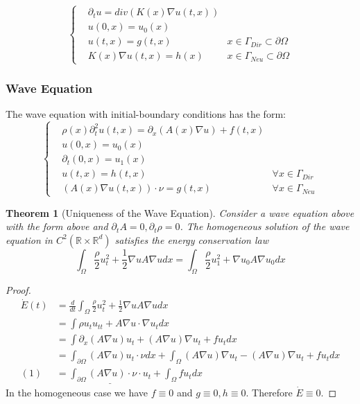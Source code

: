 \documentclass[a4paper,11pt,oneside,fleqn]{book}
\newtheorem{theorem}{Theorem}[section]
\theoremstyle{definition}
\theoremstyle{remark}
\begin{document}
\begin{equation}\label{HE_Neu}
	\left\{
	\begin{aligned}
		&\partial_t u = div(K(x) \nabla u(t, x))\\
		&u(0, x) = u_0(x)\\
		&u(t, x) = g(t, x) \quad &x \in \Gamma_{Dir}\subset \partial \Omega\\
		&K(x) \nabla u(t, x) = h(x) \quad &x \in \Gamma_{Neu} \subset \partial \Omega
	\end{aligned}
	\right.
\end{equation}

\subsubsection*{Wave Equation}
The wave equation with initial-boundary conditions has the form:
\begin{equation}
\left\{
	\begin{aligned}
		&\rho(x)\partial^2_t u(t, x) = \partial_x (A(x) \nabla u) + f(t, x)\\
		&u(0, x) = u_0(x)\\
		&\partial_t(0,x) = u_1(x)\\
		& u(t, x) = h(t, x) \quad &\forall x \in \Gamma_{Dir}\\
		& (A(x) \nabla u(t, x)) \cdot \nu = g(t, x) \quad &\forall x \in \Gamma_{Neu} 
	\end{aligned}
\right.
\end{equation}
\begin{theorem}[Uniqueness of the Wave Equation]
	Consider a wave equation above with the form above and $\partial_t A = 0, \partial_t \rho = 0$. The homogeneous solution of the wave equation in $C^2(\mathbb{R} \times \mathbb{R}^d)$ satisfies the energy conservation law
	\begin{equation}
		\int_\Omega \frac{\rho}{2}u_t^2 + \frac{1}{2}\nabla u A \nabla u dx = \int_\Omega \frac{\rho}{2} u_1^2 + \nabla u_0 A \nabla u_0 dx 
	\end{equation}
\end{theorem}
\begin{proof}
	\begin{align*}
		\dot{E}(t) &= \frac{d}{dt} \int_\Omega \frac{\rho}{2} u_t^2 + \frac{1}{2} \nabla u A \nabla u dx\\
		&= \int \rho u_t u_{tt} + A \nabla u \cdot \nabla u_t dx\\
		&= \int \partial_x (A \nabla u) u_t + (A\nabla u) \nabla u_t + f u_t dx\\
		&= \int_{\partial \Omega} (A \nabla u) u_t \cdot \nu dx + \int_\Omega (A \nabla u) \nabla u_t - (A \nabla u) \nabla u_t + f u_t dx\\
	 (1)&= \underline{ \int_{\partial \Omega} (A \nabla u) \cdot \nu \cdot u_t} + \int_\Omega f u_t  dx
	\end{align*}
	In the homogeneous case we have $f\equiv 0$ and $g \equiv 0, h \equiv 0$. Therefore $\dot{E} \equiv 0$.
\end{proof}
\end{document}
